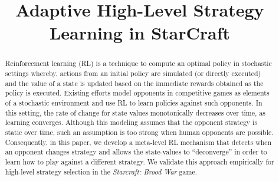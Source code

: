 \documentclass[conference]{IEEEtran}
\begin{document}
\title{Adaptive High-Level Strategy Learning in StarCraft}

\author{
 \and
}


\maketitle

\begin{abstract}

Reinforcement learning (RL) is a technique to compute an optimal policy in stochastic settings whereby, actions from an initial policy are simulated (or directly executed) and the value of a state is updated based on the immediate rewards obtained as the policy is executed. 
Existing efforts model opponents in competitive games as elements of a stochastic environment and use RL to learn policies against such opponents. 
In this setting, the rate of change for state values monotonically decreases over time, as learning converges. 
Although this modeling assumes that the opponent strategy is static over time, such an assumption is too strong when human opponents are possible. 
Consequently, in this paper, we develop a meta-level RL mechanism that detects when an opponent changes strategy and allows the state-values to ``deconverge'' in order to learn how to play against a different strategy. 
We validate this approach empirically for high-level strategy selection in the \textit{Starcraft: Brood War} game.

\end{abstract}


















\end{document}
